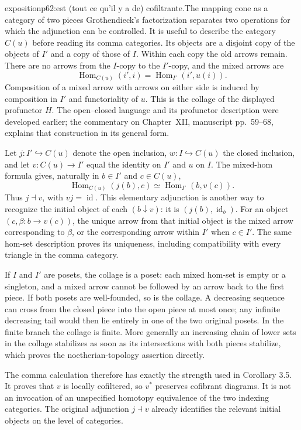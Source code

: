 \begin{dcomment}{exposition}{p62:est (tout ce qu'il y a de) cofiltrante.}{The mapping cone as a category of two pieces}
Grothendieck's factorization separates two operations for which the adjunction can be controlled. It is useful to describe the category $C(u)$ before reading its comma categories. Its objects are a disjoint copy of the objects of $I'$ and a copy of those of $I$. Within each copy the old arrows remain. There are no arrows from the $I$-copy to the $I'$-copy, and the mixed arrows are
\[
 \operatorname{Hom}_{C(u)}(i',i)
      =\operatorname{Hom}_{I'}(i',u(i)).
\]
Composition of a mixed arrow with arrows on either side is induced by composition in $I'$ and functoriality of $u$. This is the collage of the displayed profunctor $H$. The open--closed language and its profunctor description were developed earlier; the commentary on Chapter~XII, manuscript pp.~59--68, explains that construction in its general form.

Let $j:I'\hookrightarrow C(u)$ denote the open inclusion, $w:I\hookrightarrow C(u)$ the closed inclusion, and let $v:C(u)\to I'$ equal the identity on $I'$ and $u$ on $I$. The mixed-hom formula gives, naturally in $b\in I'$ and $c\in C(u)$,
\[
 \operatorname{Hom}_{C(u)}(j(b),c)
       \simeq\operatorname{Hom}_{I'}(b,v(c)).
\]
Thus $j\dashv v$, with $vj=\operatorname{id}$. This elementary adjunction is another way to recognize the initial object of each $(b\downarrow v)$: it is $(j(b),\operatorname{id}_b)$. For an object $(c,\beta:b\to v(c))$, the unique arrow from that initial object is the mixed arrow corresponding to $\beta$, or the corresponding arrow within $I'$ when $c\in I'$. The same hom-set description proves its uniqueness, including compatibility with every triangle in the comma category.

If $I$ and $I'$ are posets, the collage is a poset: each mixed hom-set is empty or a singleton, and a mixed arrow cannot be followed by an arrow back to the first piece. If both posets are well-founded, so is the collage. A decreasing sequence can cross from the closed piece into the open piece at most once; any infinite decreasing tail would then lie entirely in one of the two original posets. In the finite branch the collage is finite. More generally an increasing chain of lower sets in the collage stabilizes as soon as its intersections with both pieces stabilize, which proves the noetherian-topology assertion directly.

The comma calculation therefore has exactly the strength used in Corollary 3.5. It proves that $v$ is locally cofiltered, so $v^*$ preserves cofibrant diagrams. It is not an invocation of an unspecified homotopy equivalence of the two indexing categories. The original adjunction $j\dashv v$ already identifies the relevant initial objects on the level of categories.
\end{dcomment}

